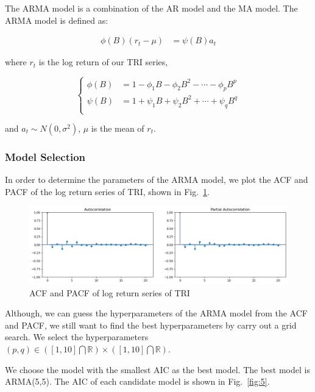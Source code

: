 \documentclass[runningheads]{llncs}
\begin{document}
The ARMA model is a combination of the AR model and the MA model. The ARMA model is defined as:

$$
    \begin{aligned}
        \phi(B)(r_t-\mu) & =\psi(B)a_t
    \end{aligned}
$$

where $r_t$ is the log return of our TRI series,

$$
    \begin{cases}
        \phi(B) & =1-\phi_1B-\phi_2B^2-\cdots-\phi_pB^p \\
        \psi(B) & =1+\psi_1B+\psi_2B^2+\cdots+\psi_qB^q \\
    \end{cases}
$$

and $a_t\sim N(0,\sigma^2)$, $\mu$ is the mean of $r_t$.

\subsubsection{Model Selection}

In order to determine the parameters of the ARMA model,
we plot the ACF and PACF of the log return series of TRI, shown in Fig.~\ref{fig:4}.


\begin{figure}[htbp]
    \centering
    \includegraphics[width=\textwidth]{../img/acfs.png}
    \caption{ACF and PACF of log return series of TRI}
    \label{fig:4}
\end{figure}

Although, we can guess the hyperparameters of the ARMA model from the ACF and PACF,
we still want to find the best hyperparameters by carry out a grid search. We select the hyperparameters $(p,q) \in ([1,10]\bigcap \mathbb{R})\times ([1,10]\bigcap \mathbb{R})$.

We choose the model with the smallest AIC as the best model. The best model is ARMA(5,5).
The AIC of each candidate model is shown in Fig.~\ref{fig:5}.

\end{document}
